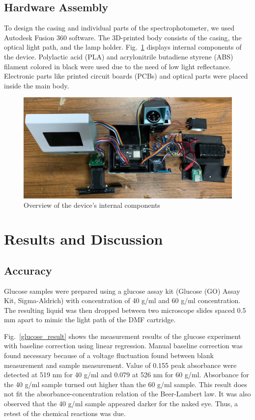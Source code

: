\documentclass[conference]{IEEEtran}
\begin{document}
\subsection{Hardware Assembly}
To design the casing and individual parts of the spectrophotometer, we used Autodesk Fusion 360 software.
The 3D-printed body consists of the casing, the optical light path, and the lamp holder.
Fig.~\ref{hardware} displays internal components of the device.
Polylactic acid (PLA) and acrylonitrile butadiene styrene (ABS) filament colored in black were used due to the need of low light reflectance.
Electronic parts like printed circuit boards (PCBs) and optical parts were placed inside the main body.

    \begin{figure}[htbp]
    \centerline{\includegraphics[scale=0.15]{hardware-2.jpg}}
    \caption{Overview of the device's internal components}
    \label{hardware}
    \end{figure}

\section{Results and Discussion}
\subsection{Accuracy}
Glucose samples were prepared using a glucose assay kit (Glucose (GO) Assay Kit, Sigma-Aldrich\cite{b7}) with concentration of 40 {\textmu}g/ml and 60 {\textmu}g/ml concentration.
The resulting liquid was then dropped between two microscope slides spaced 0.5 mm apart to mimic the light path of the DMF cartridge.

Fig.~\ref{glucose_result} shows the measurement results of the glucose experiment with baseline correction using linear regression.
Manual baseline correction was found necessary because of a voltage fluctuation found between blank measurement and sample measurement.
Value of 0.155 peak absorbance were detected at 519 nm for 40 {\textmu}g/ml and 0.079 at 526 nm for 60 {\textmu}g/ml.
Absorbance for the 40 {\textmu}g/ml sample turned out higher than the 60 {\textmu}g/ml sample.
This result does not fit the absorbance-concentration relation of the Beer-Lambert law.
It was also observed that the 40 {\textmu}g/ml sample appeared darker for the naked eye.
Thus, a retest of the chemical reactions was due.
\end{document}
